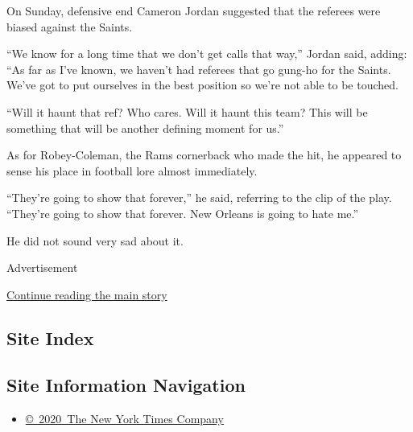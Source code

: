 On Sunday, defensive end Cameron Jordan suggested that the referees were
biased against the Saints.

``We know for a long time that we don't get calls that way,'' Jordan
said, adding: ``As far as I've known, we haven't had referees that go
gung-ho for the Saints. We've got to put ourselves in the best position
so we're not able to be touched.

``Will it haunt that ref? Who cares. Will it haunt this team? This will
be something that will be another defining moment for us.''

As for Robey-Coleman, the Rams cornerback who made the hit, he appeared
to sense his place in football lore almost immediately.

``They're going to show that forever,'' he said, referring to the clip
of the play. ``They're going to show that forever. New Orleans is going
to hate me.''

He did not sound very sad about it.

Advertisement

\protect\hyperlink{after-bottom}{Continue reading the main story}

\hypertarget{site-index}{%
\subsection{Site Index}\label{site-index}}

\hypertarget{site-information-navigation}{%
\subsection{Site Information
Navigation}\label{site-information-navigation}}

\begin{itemize}
\tightlist
\item
  \href{https://help.nytimes3xbfgragh.onion/hc/en-us/articles/115014792127-Copyright-notice}{©~2020~The
  New York Times Company}
\end{itemize}

